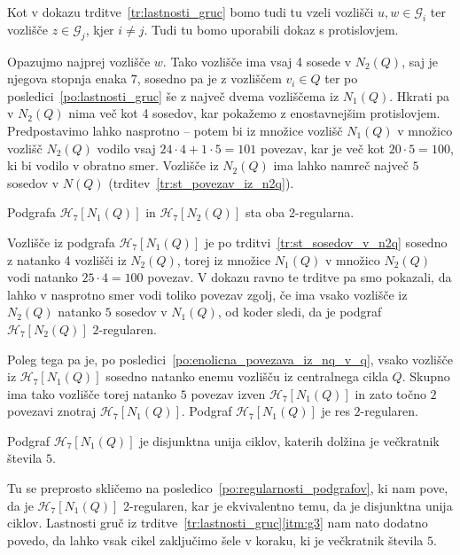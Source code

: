 \documentclass[fin1, tisk]{fmfdelo}
\newcommand{\gr}{\mathscr{G}}
\newcommand{\hof}{\mathscr{H}_{7}}
\begin{document}
\begin{dokaz}
Kot v dokazu trditve~\ref{tr:lastnosti_gruc} bomo tudi tu vzeli vozlišči $u, w \in \gr_i$
ter vozlišče $z\in\gr_j$, kjer $i \neq j$. Tudi tu bomo uporabili dokaz s protislovjem.

Opazujmo najprej vozlišče $w$. Tako vozlišče ima vsaj 4 sosede v $N_2(Q)$, 
saj je njegova stopnja enaka $7$, sosedno pa je z vozliščem 
$v_i \in Q$ ter po posledici~\ref{po:lastnosti_gruc} še z največ dvema
vozliščema iz $N_1(Q)$. Hkrati pa v $N_2(Q)$ nima več kot 4 sosedov, kar pokažemo z enostavnejšim 
protislovjem. Predpostavimo lahko nasprotno -- potem bi iz množice vozlišč $N_1(Q)$ 
v množico vozlišč $N_2(Q)$ vodilo vsaj 
$24\cdot 4 + 1\cdot 5 = 101$ povezav, kar je več kot $20\cdot 5 = 100$, ki bi vodilo v obratno 
smer. Vozlišče iz $N_2(Q)$ ima lahko namreč največ $5$ sosedov v $N(Q)$ 
(trditev~\ref{tr:st_povezav_iz_n2q}).
\end{dokaz}

\begin{posledica}\label{po:regularnosti_podgrafov}
    Podgrafa $\hof[N_1(Q)]$ in $\hof[N_2(Q)]$ sta oba 2-regularna. 
\end{posledica}

\begin{dokaz}
    Vozlišče iz podgrafa $\hof[N_1(Q)]$ je po trditvi~\ref{tr:st_sosedov_v_n2q} sosedno 
    z natanko 4 vozlišči iz $N_2(Q)$, torej iz množice $N_1(Q)$ v množico $N_2(Q)$
    vodi natanko $25\cdot 4 = 100$ povezav. V dokazu ravno te trditve pa smo pokazali,
    da lahko v nasprotno smer vodi toliko povezav zgolj, če ima vsako vozlišče iz $N_2(Q)$ 
    natanko $5$ sosedov v $N_1(Q)$, od koder sledi, da je podgraf $\hof[N_2(Q)]$ $2$-regularen.
    
    Poleg tega pa je, po 
    posledici~\ref{po:enolicna_povezava_iz_nq_v_q}, vsako vozlišče iz $\hof[N_1(Q)]$ sosedno
    natanko enemu vozlišču iz centralnega cikla $Q$. Skupno ima tako vozlišče torej natanko $5$ povezav izven 
    $\hof[N_1(Q)]$ in zato točno $2$ povezavi znotraj $\hof[N_1(Q)]$. Podgraf $\hof[N_1(Q)]$ je res $2$-regularen.
\end{dokaz}

\begin{trditev}\label{tr:unija_ciklov}
    Podgraf $\hof[N_1(Q)]$ je disjunktna unija ciklov, 
    katerih dolžina je večkratnik števila $5$.
\end{trditev}

\begin{dokaz}
    Tu se preprosto skličemo na posledico~\ref{po:regularnosti_podgrafov}, ki nam pove,
    da je $\hof[N_1(Q)]$ 2-regularen, kar je ekvivalentno temu, da je disjunktna unija ciklov.
    Lastnosti gruč iz trditve~\ref{tr:lastnosti_gruc}\ref{itm:g3} nam nato dodatno povedo, da lahko vsak 
    cikel zaključimo šele v koraku, ki je večkratnik števila $5$. 
\end{dokaz}
\end{document}
